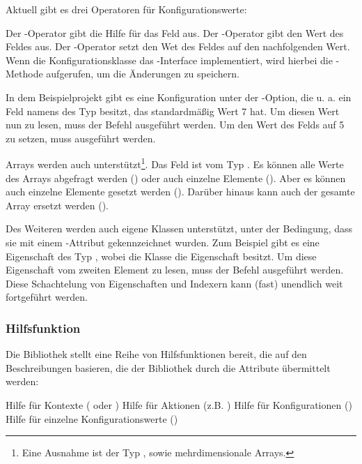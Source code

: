 Aktuell gibt es drei Operatoren für Konfigurationswerte:
\begin{outline}
 \1 Der -Operator gibt die Hilfe für das Feld aus.
 \1 Der -Operator gibt den Wert des Feldes aus.
 \1 Der -Operator setzt den Wet des Feldes auf den nachfolgenden Wert.
 Wenn die Konfigurationsklasse das -Interface implementiert, wird hierbei die -Methode aufgerufen, um die \"Anderungen zu speichern.
 \end{outline}

In dem Beispielprojekt gibt es eine Konfiguration unter der -Option, die u. a. ein Feld namens  des Typ  besitzt,
das standardmäßig Wert 7 hat.
Um diesen Wert nun zu lesen, muss der Befehl  ausgeführt werden.
Um den Wert des Felds auf 5 zu setzen, muss  ausgeführt werden.

Arrays werden auch unterstützt\footnote{Eine Ausnahme ist der Typ , sowie mehrdimensionale Arrays.}.
Das Feld  ist vom Typ .
Es können alle Werte des Arrays abgefragt werden ()
oder auch einzelne Elemente ().
Aber es können auch einzelne Elemente gesetzt werden ().
Darüber hinaus kann auch der gesamte Array ersetzt werden ().

Des Weiteren werden auch eigene Klassen unterstützt, unter der Bedingung, dass sie mit einem -Attribut gekennzeichnet wurden.
Zum Beispiel gibt es eine Eigenschaft des Typ , wobei die Klasse  die Eigenschaft  besitzt.
Um diese Eigenschaft vom zweiten Element zu lesen, muss der Befehl  ausgeführt werden.
Diese Schachtelung von Eigenschaften und Indexern kann (fast) unendlich weit fortgeführt werden.
\subsubsection{Hilfsfunktion}
Die Bibliothek stellt eine Reihe von Hilfsfunktionen bereit, die auf den Beschreibungen basieren, die der Bibliothek durch die Attribute übermittelt werden:
\begin{outline}
 \1 Hilfe für Kontexte ( oder )
 \1 Hilfe für Aktionen (z.B. )
 \1 Hilfe für Konfigurationen ()
 \1 Hilfe für einzelne Konfigurationswerte ()
\end{outline}
